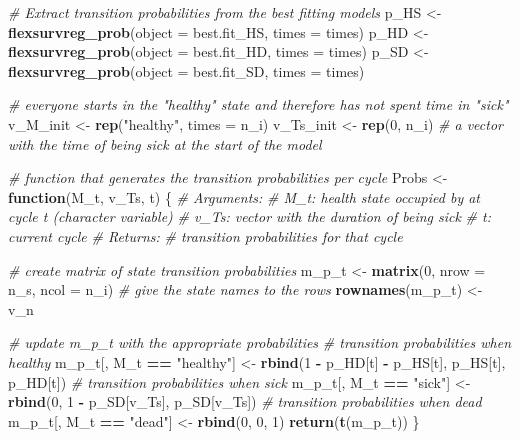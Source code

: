 \documentclass[
]{article}
\newenvironment{Shaded}{\begin{snugshade}}{\end{snugshade}}
\newcommand{\CommentTok}[1]{\textcolor[rgb]{0.56,0.35,0.01}{\textit{#1}}}
\newcommand{\ControlFlowTok}[1]{\textcolor[rgb]{0.13,0.29,0.53}{\textbf{#1}}}
\newcommand{\DataTypeTok}[1]{\textcolor[rgb]{0.13,0.29,0.53}{#1}}
\newcommand{\DecValTok}[1]{\textcolor[rgb]{0.00,0.00,0.81}{#1}}
\newcommand{\KeywordTok}[1]{\textcolor[rgb]{0.13,0.29,0.53}{\textbf{#1}}}
\newcommand{\NormalTok}[1]{#1}
\newcommand{\OperatorTok}[1]{\textcolor[rgb]{0.81,0.36,0.00}{\textbf{#1}}}
\newcommand{\StringTok}[1]{\textcolor[rgb]{0.31,0.60,0.02}{#1}}
\begin{document}
\begin{Shaded}
\begin{Highlighting}[]
\CommentTok{# Extract transition probabilities from the best fitting models}
\NormalTok{p_HS <-}\StringTok{ }\KeywordTok{flexsurvreg_prob}\NormalTok{(}\DataTypeTok{object =}\NormalTok{ best.fit_HS, }\DataTypeTok{times =}\NormalTok{ times)}
\NormalTok{p_HD <-}\StringTok{ }\KeywordTok{flexsurvreg_prob}\NormalTok{(}\DataTypeTok{object =}\NormalTok{ best.fit_HD, }\DataTypeTok{times =}\NormalTok{ times)}
\NormalTok{p_SD <-}\StringTok{ }\KeywordTok{flexsurvreg_prob}\NormalTok{(}\DataTypeTok{object =}\NormalTok{ best.fit_SD, }\DataTypeTok{times =}\NormalTok{ times)}

\CommentTok{# everyone starts in the "healthy" state and therefore has not spent time in "sick"}
\NormalTok{v_M_init  <-}\StringTok{ }\KeywordTok{rep}\NormalTok{(}\StringTok{"healthy"}\NormalTok{, }\DataTypeTok{times =}\NormalTok{ n_i)   }
\NormalTok{v_Ts_init <-}\StringTok{ }\KeywordTok{rep}\NormalTok{(}\DecValTok{0}\NormalTok{, n_i)  }\CommentTok{# a vector with the time of being sick at the start of the model }

\CommentTok{# function that generates the transition probabilities per cycle}
\NormalTok{Probs <-}\StringTok{ }\ControlFlowTok{function}\NormalTok{(M_t, v_Ts, t) \{ }
  \CommentTok{# Arguments:}
    \CommentTok{# M_t: health state occupied by at cycle t (character variable)}
    \CommentTok{# v_Ts: vector with the duration of being sick}
    \CommentTok{# t:     current cycle }
  \CommentTok{# Returns: }
    \CommentTok{# transition probabilities for that cycle}
  
  \CommentTok{# create matrix of state transition probabilities}
\NormalTok{  m_p_t           <-}\StringTok{ }\KeywordTok{matrix}\NormalTok{(}\DecValTok{0}\NormalTok{, }\DataTypeTok{nrow =}\NormalTok{ n_s, }\DataTypeTok{ncol =}\NormalTok{ n_i) }
  \CommentTok{# give the state names to the rows}
  \KeywordTok{rownames}\NormalTok{(m_p_t) <-}\StringTok{  }\NormalTok{v_n                              }
  
  \CommentTok{# update m_p_t with the appropriate probabilities   }
  \CommentTok{# transition probabilities when healthy }
\NormalTok{  m_p_t[, M_t }\OperatorTok{==}\StringTok{ "healthy"}\NormalTok{] <-}\StringTok{ }\KeywordTok{rbind}\NormalTok{(}\DecValTok{1} \OperatorTok{-}\StringTok{ }\NormalTok{p_HD[t] }\OperatorTok{-}\StringTok{ }\NormalTok{p_HS[t], p_HS[t], p_HD[t])    }
  \CommentTok{# transition probabilities when sick }
\NormalTok{  m_p_t[, M_t }\OperatorTok{==}\StringTok{ "sick"}\NormalTok{]    <-}\StringTok{ }\KeywordTok{rbind}\NormalTok{(}\DecValTok{0}\NormalTok{, }\DecValTok{1} \OperatorTok{-}\StringTok{ }\NormalTok{p_SD[v_Ts], p_SD[v_Ts])  }
  \CommentTok{# transition probabilities when dead     }
\NormalTok{  m_p_t[, M_t }\OperatorTok{==}\StringTok{ "dead"}\NormalTok{]    <-}\StringTok{ }\KeywordTok{rbind}\NormalTok{(}\DecValTok{0}\NormalTok{, }\DecValTok{0}\NormalTok{, }\DecValTok{1}\NormalTok{)                            }
  \KeywordTok{return}\NormalTok{(}\KeywordTok{t}\NormalTok{(m_p_t))}
\NormalTok{\}       }
\end{Highlighting}
\end{Shaded}
\end{document}
